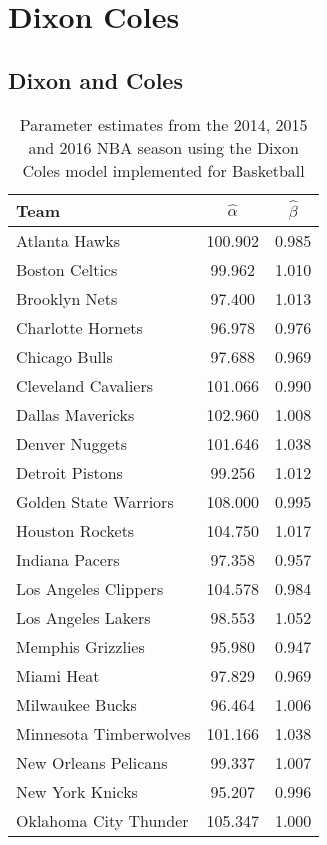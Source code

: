 \chapter{Dixon Coles}


\section{Dixon and Coles}

\begin{table}[t]
	\centering
	\caption{Parameter estimates from the 2014, 2015 and 2016 NBA season using the Dixon Coles model implemented for Basketball}
	\begin{tabular}{|l|c|c|}
		\hline
		\textbf{Team}  & \textbf{$\hat{\alpha}$} & \textbf{$\hat{\beta}$} \\ \hline
		Atlanta Hawks  & 100.902 & 0.985\\ \hline
		Boston Celtics & 99.962 & 1.010\\ \hline
		Brooklyn Nets  & 97.400 & 1.013\\ \hline
		Charlotte Hornets & 96.978 & 0.976\\ \hline
		Chicago Bulls & 97.688 & 0.969\\ \hline
		Cleveland Cavaliers & 101.066 & 0.990\\ \hline
		Dallas Mavericks & 102.960 & 1.008 \\ \hline
		Denver Nuggets & 101.646 & 1.038\\ \hline
		Detroit Pistons & 99.256 & 1.012\\ \hline
		Golden State Warriors & 108.000 & 0.995\\ \hline
		Houston Rockets & 104.750 & 1.017 \\ \hline
		Indiana Pacers & 97.358 & 0.957 \\ \hline
		Los Angeles Clippers & 104.578 & 0.984\\ \hline
		Los Angeles Lakers & 98.553 & 1.052 \\ \hline
		Memphis Grizzlies & 95.980 & 0.947\\ \hline
		Miami Heat & 97.829 & 0.969\\ \hline
		Milwaukee Bucks & 96.464 & 1.006\\ \hline
		Minnesota Timberwolves & 101.166 & 1.038\\ \hline
		New Orleans Pelicans & 99.337 & 1.007\\ \hline
		New York Knicks & 95.207 & 0.996\\ \hline
		Oklahoma City Thunder & 105.347 & 1.000\\ \hline

\end{tabular}
\end{table}

